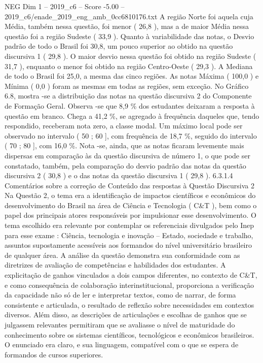 \begin{textsample}{NEG Dim 1 – 2019\_c6 – Score -5.00 – 2019\_c6/enade\_2019\_eng\_amb\_0cc6810176.txt}
A região Norte foi aquela cuja Média, também nessa questão, foi menor ( 26,8 ), mas a de maior Média nessa questão foi a região Sudeste ( 33,9 ).
Quanto à variabilidade das notas, o Desvio padrão de todo o Brasil foi 30,8, um pouco superior ao obtido na questão discursiva 1 ( 29,8 ).
O maior desvio nessa questão foi obtido na região Sudeste ( 31,7 ), enquanto o menor foi obtido na região Centro-Oeste ( 29,3 ).
A Mediana de todo o Brasil foi 25,0, a mesma das cinco regiões.
As notas Máxima ( 100,0 ) e Mínima ( 0,0 ) foram as mesmas em todas as regiões, sem exceção.
No Gráfico 6.8, mostra -se a distribuição das notas na questão discursiva 2 do Componente de Formação Geral.
Observa -se que 8,9 \% dos estudantes deixaram a resposta à questão em branco.
Chega a 41,2 \%, se agregado à frequência daqueles que, tendo respondido, receberam nota zero, a classe modal.
Um máximo local pode ser observado no intervalo ( 50 ; 60 ], com frequência de 18,7 \%, seguido do intervalo ( 70 ; 80 ], com 16,0 \%.
Nota -se, ainda, que as notas ficaram levemente mais dispersas em comparação às da questão discursiva de número 1, o que pode ser constatado, também, pela comparação do desvio padrão das notas da questão discursiva 2 ( 30,8 ) e o das notas da questão discursiva 1 ( 29,8 ). 6.3.1.4 Comentários sobre a correção de Conteúdo das respostas à Questão Discursiva 2 Na Questão 2, o tema era a identificação de impactos científicos e econômicos do desenvolvimento do Brasil na área de Ciência e Tecnologia ( C\&T ), bem como o papel dos principais atores responsáveis por impulsionar esse desenvolvimento.
O tema escolhido era relevante por contemplar os referenciais divulgados pelo Inep para esse exame : Ciência, tecnologia e inovação – Estado, sociedade e trabalho, assuntos supostamente acessíveis aos formandos do nível universitário brasileiro de qualquer área.
A análise da questão demonstra sua conformidade com as diretrizes de avaliação de competências e habilidades dos estudantes.
A explicitação de ganhos vinculados a dois campos diferentes, no contexto de C\&T, e como consequência de colaboração interinstitucional, proporciona a verificação da capacidade não só de ler e interpretar textos, como de narrar, de forma consistente e articulada, o resultado de reflexão sobre necessidades em contextos diversos.
Além disso, as descrições de articulações e escolhas de ganhos que se julgassem relevantes permitiram que se avaliasse o nível de maturidade do conhecimento sobre os sistemas científicos, tecnológicos e econômicos brasileiros.
O enunciado era claro, e sua linguagem, compatível com o que se espera de formandos de cursos superiores.

\end{textsample}
